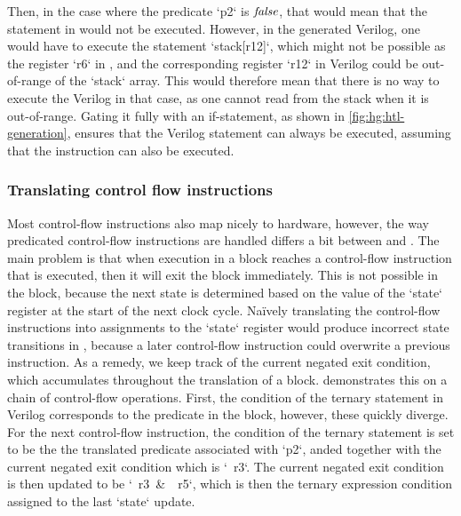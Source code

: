 \noindent Then, in the case where the predicate \rtlinline`p2` is $\mathit{false}$,
that would mean that the statement in \rtlsubpar{} would not be executed.
However, in the generated Verilog, one would have to execute the statement
\veriloginline`stack[r12]`, which might not be possible as the register
\rtlinline`r6` in \rtlsubpar{}, and the corresponding register
\veriloginline`r12` in Verilog could be out-of-range of the
\veriloginline`stack` array.  This would therefore mean that there is no way to
execute the Verilog in that case, as one cannot read from the stack when it is
out-of-range.  Gating it fully with an if-statement, as shown in
\cref{fig:hg:htl-generation}, ensures that the Verilog statement can always be
executed, assuming that the \rtlsubpar{} instruction can also be executed.

\subsubsection{Translating control flow instructions}%
\label{sec:hg:translating-control-flow-instructions}

Most control-flow instructions also map nicely to hardware, however, the way
predicated control-flow instructions are handled differs a bit between
\rtlsubpar{} and \htl{}.  The main problem is that when execution in a
\rtlsubpar{} block reaches a control-flow instruction that is executed, then it
will exit the block immediately.  This is not possible in the \htl{} block,
because the next state is determined based on the value of the
\veriloginline`state` register at the start of the next clock cycle.  Na\"ively
translating the control-flow instructions into assignments to the
\veriloginline`state` register would produce incorrect state transitions in
\htl{}, because a later control-flow instruction could overwrite a previous
instruction.  As a remedy, we keep track of the current negated exit condition,
which accumulates throughout the translation of a block.
 demonstrates this on a chain of control-flow
operations.  First, the condition of the ternary statement in Verilog
corresponds to the predicate in the block, however, these quickly diverge.  For
the next control-flow instruction, the condition of the ternary statement is set
to be the the translated predicate associated with \rtlinline`p2`, anded
together with the current negated exit condition which is \veriloginline`~r3`.
The current negated exit condition is then updated to be
\veriloginline`~r3 & ~r5`, which is then the ternary expression condition
assigned to the last \veriloginline`state` update.

